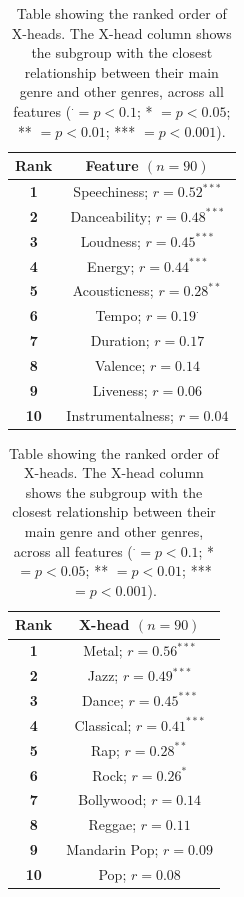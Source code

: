 \documentclass[a4paper]{article}
\newcommand{\dotr}{\mbox{$\boldsymbol{\cdot}$}}
\begin{document}
\begin{table}
\centering
\setlength\tabcolsep{4pt}
\begin{minipage}[t]{0.48\textwidth}
\centering
\begin{tabular}{|c|c|}\hline
\textbf{Rank} & \textbf{Feature} $(n=90)$  \\
  \hline
\textbf{1} & Speechiness; $r=0.52^{***}$ \\
 \hline
\textbf{2} &  Danceability; $r=0.48^{***}$ \\
 \hline
\textbf{3} & Loudness; $r=0.45^{***}$ \\
\hline
\textbf{4} &  Energy; $r=0.44^{***}$  \\
\hline
\textbf{5} & Acousticness; $r=0.28^{**}$ \\
\hline
\textbf{6} & Tempo; $r=0.19^{\dotr}$ \\
\hline
\textbf{7} & Duration; $r=0.17$ \\
\hline
\textbf{8} & Valence; $r=0.14$ \\
\hline
\textbf{9} & Liveness; $r=0.06$ \\
\hline
\textbf{10} & Instrumentalness; $r=0.04$ \\
\hline
\end{tabular}
\caption[Feature Preference Influence]{Table showing the ranked order of features. The feature column shows which feature of X-heads' main genres is closest to their other genres ($^{\dotr} = p < 0.1$; * $= p < 0.05$; ** $= p < 0.01$; *** $= p < 0.001$).} 
\label{tab:feature} 
\end{minipage}%
\hfill
\begin{minipage}[t]{0.48\textwidth}
\centering
\begin{tabular}{|c|c|}\hline
\textbf{Rank} & \textbf{X-head} $(n=90)$  \\
  \hline
\textbf{1} & Metal; $r=0.56^{***}$ \\
 \hline
\textbf{2} & Jazz; $r=0.49^{***}$ \\
 \hline
\textbf{3} & Dance; $r=0.45^{***}$  \\
\hline
\textbf{4} & Classical; $r=0.41^{***}$ \\
\hline
\textbf{5} & Rap; $r=0.28^{**}$ \\
\hline
\textbf{6} & Rock; $r=0.26^{*}$ \\
\hline
\textbf{7} & Bollywood; $r=0.14$ \\
\hline
\textbf{8} & Reggae; $r=0.11$  \\
\hline
\textbf{9} & Mandarin Pop; $r=0.09$ \\
\hline
\textbf{10} & Pop; $r=0.08$ \\
\hline
\end{tabular}
 \caption[Genre Preference Influence]{Table showing the ranked order of X-heads. The X-head column shows the subgroup with the closest relationship between their main genre and other genres, across all features ($^{\dotr} = p < 0.1$; * $= p < 0.05$; ** $= p < 0.01$; *** $= p < 0.001$).} 
 \label{tab:xhead} 
\end{minipage}
\end{table} 
\end{document}
